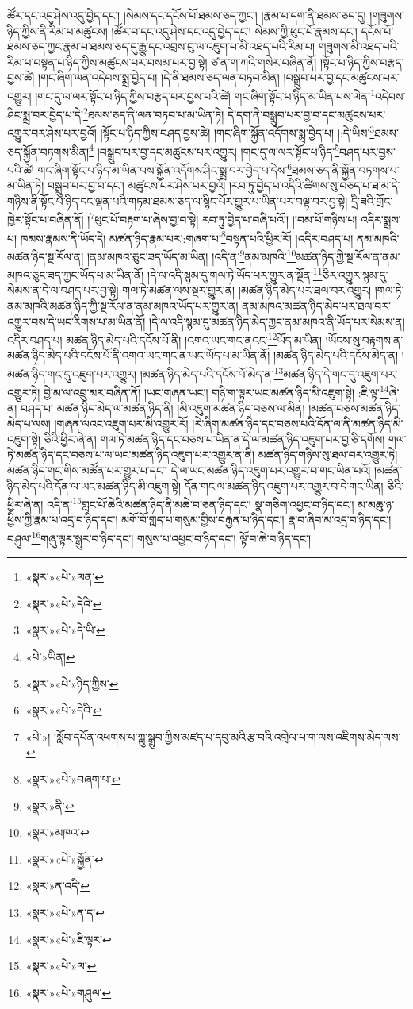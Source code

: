 ཚོར་དང་འདུ་ཤེས་འདུ་བྱེད་དང་། །སེམས་དང་དངོས་པོ་ཐམས་ཅད་ཀྱང་། །རྣམ་པ་དག་ནི་ཐམས་ཅད་དུ། །གཟུགས་ཉིད་ཀྱིས་ནི་རིམ་པ་མཚུངས། །ཚོར་བ་དང་འདུ་ཤེས་དང་འདུ་བྱེད་དང་། སེམས་ཀྱི་ཕུང་པོ་རྣམས་དང་། དངོས་པོ་ཐམས་ཅད་ཀྱང་རྣམ་པ་ཐམས་ཅད་དུ་རྒྱུ་དང་འབྲས་བུ་ལ་འཇུག་པ་མི་འཐད་པའི་རིམ་པ། གཟུགས་མི་འཐད་པའི་རིམ་པ་བསྟན་པ་ཉིད་ཀྱིས་མཚུངས་པར་བསམ་པར་བྱ་སྟེ། ཙ་ན་ག་ཀའི་གསེར་བཞིན་ནོ། །སྟོང་པ་ཉིད་ཀྱིས་བརྩད་བྱས་ཚེ། །གང་ཞིག་ལན་འདེབས་སྨྲ་བྱེད་པ། །དེ་ནི་ཐམས་ཅད་ལན་བཏབ་མིན། །བསྒྲུབ་པར་བྱ་དང་མཚུངས་པར་འགྱུར། །གང་དུ་ལ་ལར་སྟོང་པ་ཉིད་ཀྱིས་བརྩད་པར་བྱས་པའི་ཚེ། གང་ཞིག་སྟོང་པ་ཉིད་མ་ཡིན་པས་ལེན་\footnote{«སྣར་»«པེ་»ལན་}འདེབས་ཤིང་སྨྲ་བར་བྱེད་པ་དེ་\footnote{«སྣར་»«པེ་»དེའི་}ཐམས་ཅད་ནི་ལན་བཏབ་པ་མ་ཡིན་ཏེ། དེ་དག་ནི་བསྒྲུབ་པར་བྱ་བ་དང་མཚུངས་པར་འགྱུར་བར་ཤེས་པར་བྱའོ། །སྟོང་པ་ཉིད་ཀྱིས་བཤད་བྱས་ཚེ། །གང་ཞིག་སྐྱོན་འདོགས་སྨྲ་བྱེད་པ། །:དེ་ཡིས་\footnote{«སྣར་»«པེ་»དེ་ཡི་}ཐམས་ཅད་སྐྱོན་བཏགས་མིན།\footnote{«པེ་»ཡིན།} །བསྒྲུབ་པར་བྱ་དང་མཚུངས་པར་འགྱུར། །གང་དུ་ལ་ལར་སྟོང་པ་ཉིད་\footnote{«སྣར་»«པེ་»ཉིད་ཀྱིས་}བཤད་པར་བྱས་པའི་ཚེ། གང་ཞིག་སྟོང་པ་ཉིད་མ་ཡིན་པས་སྐྱོན་འདོགས་ཤིང་སྨྲ་བར་བྱེད་པ་དེས་\footnote{«སྣར་»«པེ་»དེའི་}ཐམས་ཅད་ནི་སྐྱོན་བཏགས་པ་མ་ཡིན་ཏེ། བསྒྲུབ་པར་བྱ་བ་དང་། མཚུངས་པར་ཤེས་པར་བྱའོ། །རབ་ཏུ་བྱེད་པ་འདིའི་ཚིགས་སུ་བཅད་པ་ཐ་མ་དེ་གཉིས་ནི་སྟོང་པ་ཉིད་དང་ལྡན་པའི་གཏམ་ཐམས་ཅད་ལ་སྙིང་པོར་གྱུར་པ་ཡིན་པར་བལྟ་བར་བྱ་སྟེ། དྲི་ཟའི་གྲོང་ཁྱེར་སྟོང་པ་བཞིན་ནོ། །\footnote{«པེ་»། །སློབ་དཔོན་འཕགས་པ་ཀླུ་སྒྲུབ་ཀྱིས་མཛད་པ་དབུ་མའི་རྩ་བའི་འགྲེལ་པ་ག་ལས་འཇིགས་མེད་ལས་}ཕུང་པོ་བརྟག་པ་ཞེས་བྱ་བ་སྟེ། རབ་ཏུ་བྱེད་པ་བཞི་པའོ།། །།བམ་པོ་གཉིས་པ། འདིར་སྨྲས་པ། ཁམས་རྣམས་ནི་ཡོད་དེ། མཚན་ཉིད་རྣམ་པར་:གཞག་པ་\footnote{«སྣར་»«པེ་»བཞག་པ་}བསྟན་པའི་ཕྱིར་རོ། །འདིར་བཤད་པ། ནམ་མཁའི་མཚན་ཉིད་སྔ་རོལ་ན། །ནམ་མཁའ་ཅུང་ཟད་ཡོད་མ་ཡིན། །འདི་ན་\footnote{«སྣར་»ནི་}ནམ་མཁའི་\footnote{«སྣར་»མཁའ་}མཚན་ཉིད་ཀྱི་སྔ་རོལ་ན་ནམ་མཁའ་ཅུང་ཟད་ཀྱང་ཡོད་པ་མ་ཡིན་ནོ། །དེ་ལ་འདི་སྙམ་དུ་གལ་ཏེ་ཡོད་པར་གྱུར་ན་སྔོན་\footnote{«སྣར་»«པེ་»སྐྱོན་}ཅིར་འགྱུར་སྙམ་དུ་སེམས་ན་དེ་ལ་བཤད་པར་བྱ་སྟེ། གལ་ཏེ་མཚན་ལས་སྔར་གྱུར་ན། །མཚན་ཉིད་མེད་པར་ཐལ་བར་འགྱུར། །གལ་ཏེ་ནམ་མཁའི་མཚན་ཉིད་ཀྱི་སྔ་རོལ་ན་ནམ་མཁའ་ཡོད་པར་གྱུར་ན། ནམ་མཁའ་མཚན་ཉིད་མེད་པར་ཐལ་བར་འགྱུར་བས་དེ་ཡང་རིགས་པ་མ་ཡིན་ནོ། །དེ་ལ་འདི་སྙམ་དུ་མཚན་ཉིད་མེད་ཀྱང་ནམ་མཁའ་ནི་ཡོད་པར་སེམས་ན། འདིར་བཤད་པ། མཚན་ཉིད་མེད་པའི་དངོས་པོ་ནི། །འགའ་ཡང་གང་ནའང་\footnote{«སྣར་»ན་འདི་}ཡོད་མ་ཡིན། །ཡོངས་སུ་བརྟགས་ན་མཚན་ཉིད་མེད་པའི་དངོས་པོ་ནི་འགའ་ཡང་གང་ན་ཡང་ཡོད་པ་མ་ཡིན་ནོ། །མཚན་ཉིད་མེད་པའི་དངོས་མེད་ན། །མཚན་ཉིད་གང་དུ་འཇུག་པར་འགྱུར། །མཚན་ཉིད་མེད་པའི་དངོས་པོ་མེད་ན་\footnote{«སྣར་»«པེ་»ན་ད་}མཚན་ཉིད་དེ་གང་དུ་འཇུག་པར་འགྱུར་ཏེ། བྱེ་མ་ལ་འབྲུ་མར་བཞིན་ནོ། །ཡང་གཞན་ཡང་། གཉི་ག་ལྟར་ཡང་མཚན་ཉིད་མི་འཇུག་སྟེ། :ཇི་ལྟ་\footnote{«སྣར་»«པེ་»ཇི་ལྟར་}ཞེ་ན། བཤད་པ། མཚན་ཉིད་མེད་ལ་མཚན་ཉིད་ནི། །མི་འཇུག་མཚན་ཉིད་བཅས་ལ་མིན། །མཚན་བཅས་མཚན་ཉིད་མེད་པ་ལས། །གཞན་ལའང་འཇུག་པར་མི་འགྱུར་རོ། །རེ་ཞིག་མཚན་ཉིད་དང་བཅས་པའི་དོན་ལ་ནི་མཚན་ཉིད་མི་འཇུག་སྟེ། ཅིའི་ཕྱིར་ཞེ་ན། གལ་ཏེ་མཚན་ཉིད་དང་བཅས་པ་ཡིན་ན་དེ་ལ་མཚན་ཉིད་འཇུག་པར་བྱ་ཅི་དགོས། གལ་ཏེ་མཚན་ཉིད་དང་བཅས་པ་ལ་ཡང་མཚན་ཉིད་འཇུག་པར་འགྱུར་ན་ནི། མཚན་ཉིད་གཉིས་སུ་ཐལ་བར་འགྱུར་ཏེ། མཚན་ཉིད་གང་གིས་མཚོན་པར་གྱུར་པ་དང་། དེ་ལ་ཡང་མཚན་ཉིད་འཇུག་པར་འགྱུར་བ་གང་ཡིན་པའོ། །མཚན་ཉིད་མེད་པའི་དོན་ལ་ཡང་མཚན་ཉིད་མི་འཇུག་སྟེ། དོན་གང་ལ་མཚན་ཉིད་འཇུག་པར་འགྱུར་བ་དེ་གང་ཡིན། ཅིའི་ཕྱིར་ཞེ་ན། འདི་ན་\footnote{«སྣར་»«པེ་»ལ་}གླང་པོ་ཆེའི་མཚན་ཉིད་ནི་མཆེ་བ་ཅན་ཉིད་དང་། སྣ་གཅིག་འཕྱང་བ་ཉིད་དང་། མ་མཆུ་ཉ་ཕྱིས་ཀྱི་རྣམ་པ་འདྲ་བ་ཉིད་དང་། མགོ་བོ་གླད་པ་གསུམ་གྱིས་བརྒྱན་པ་ཉིད་དང་། རྣ་བ་ཞིབ་མ་འདྲ་བ་ཉིད་དང་། བཤུལ་\footnote{«སྣར་»«པེ་»གཤུལ་}གཞུ་ལྟར་སྒུར་བ་ཉིད་དང་། གསུས་པ་འཕྱང་བ་ཉིད་དང་། ལྟོ་བ་ཆེ་བ་ཉིད་དང་། 